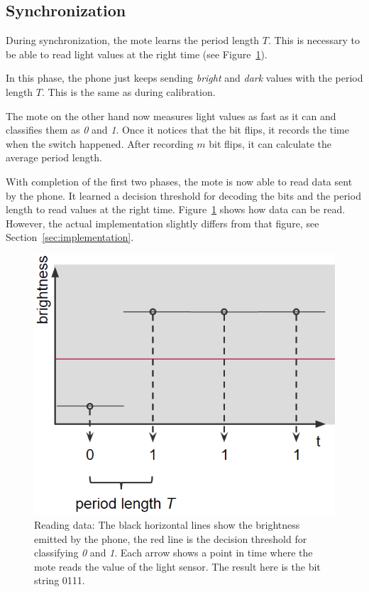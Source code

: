 \documentclass{sig-alternate} %
\begin{document}
\subsection{Synchronization}
\label{sub:synchronization}

During synchronization, the mote learns the period length $T$.
This is necessary to be able to read light values at the right time (see Figure~\ref{fig:read_a_bit}).

In this phase, the phone just keeps sending \textit{bright} and \textit{dark} values with the period length $T$.
This is the same as during calibration.

The mote on the other hand now measures light values as fast as it can and classifies them as \textit{0} and \textit{1}.
Once it notices that the bit flips, it records the time when the switch happened.
After recording $m$ bit flips, it can calculate the average period length.

With completion of the first two phases, the mote is now able to read data sent by the phone.
It learned a decision threshold for decoding the bits and the period length to read values at the right time.
Figure~\ref{fig:read_a_bit} shows how data can be read.
However, the actual implementation slightly differs from that figure, see Section~\ref{sec:implementation}.

\begin{figure}
	\centering
	\includegraphics[scale=.5]{images/reading_data.png}
	\caption{Reading data: The black horizontal lines show the brightness emitted by the phone, the red line is the decision threshold for classifying \textit{0} and \textit{1}. Each arrow shows a point in time where the mote reads the value of the light sensor. The result here is the bit string 0111.}
	\label{fig:read_a_bit}
\end{figure}
\end{document}
